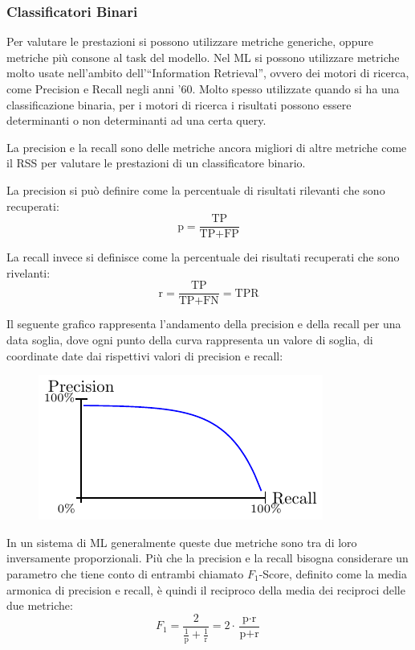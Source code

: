 \documentclass{article}
\numberwithin{equation}{subsection}
\begin{document}
\subsubsection{Classificatori Binari}

Per valutare le prestazioni si possono utilizzare metriche generiche, oppure metriche più 
consone al task del modello. Nel ML si possono utilizzare metriche molto usate nell'ambito dell'``Information Retrieval'', ovvero dei motori di ricerca, come Precision e Recall negli anni '60. 
Molto spesso utilizzate quando si ha una classificazione binaria, per i motori di ricerca i risultati possono essere determinanti o non determinanti ad una certa query. 

La precision e la recall sono delle metriche ancora migliori di altre metriche come il RSS per valutare le prestazioni di un classificatore binario. 

La precision si può definire come la percentuale di risultati rilevanti che sono 
recuperati:
\begin{equation}
    \text{p}=\displaystyle\frac{\text{TP}}{\text{TP}+\text{FP}}
\end{equation}

La recall invece si definisce come la percentuale dei risultati recuperati che sono 
rivelanti:
\begin{equation}
    \text{r}=\displaystyle\frac{\text{TP}}{\text{TP}+\text{FN}}=\text{TPR}
\end{equation}

Il seguente grafico rappresenta l'andamento della precision e della recall per una data soglia, dove ogni punto della curva rappresenta un valore di soglia, di coordinate date dai rispettivi valori di precision e recall:
\begin{figure}[H]%
    \centering%
    \includegraphics{precision_recall.pdf}%
\end{figure}

In un sistema di ML generalmente queste due metriche sono tra di loro inversamente proporzionali. Più che la precision e la recall bisogna considerare un parametro che tiene conto di entrambi chiamato $F_1$-Score, definito come la media armonica di precision e recall, è quindi il reciproco della media dei reciproci delle due metriche:
\begin{equation}
    F_1=\displaystyle\frac{2}{\frac{1}{\text{p}}+\frac{1}{\text{r}}}=2\cdot\frac{\text{p}\cdot\text{r}}{\text{p}+\text{r}}
\end{equation}
\end{document}
